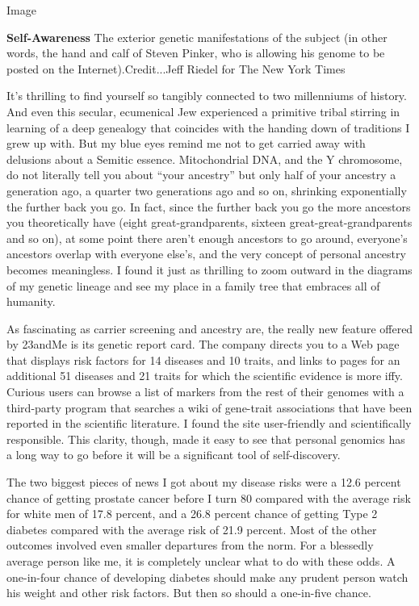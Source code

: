 Image

\textbf{Self-Awareness} The exterior genetic manifestations of the
subject (in other words, the hand and calf of Steven Pinker, who is
allowing his genome to be posted on the Internet).Credit...Jeff Riedel
for The New York Times

It's thrilling to find yourself so tangibly connected to two millenniums
of history. And even this secular, ecumenical Jew experienced a
primitive tribal stirring in learning of a deep genealogy that coincides
with the handing down of traditions I grew up with. But my blue eyes
remind me not to get carried away with delusions about a Semitic
essence. Mitochondrial DNA, and the Y chromosome, do not literally tell
you about ``your ancestry'' but only half of your ancestry a generation
ago, a quarter two generations ago and so on, shrinking exponentially
the further back you go. In fact, since the further back you go the more
ancestors you theoretically have (eight great-grandparents, sixteen
great-great-grandparents and so on), at some point there aren't enough
ancestors to go around, everyone's ancestors overlap with everyone
else's, and the very concept of personal ancestry becomes meaningless. I
found it just as thrilling to zoom outward in the diagrams of my genetic
lineage and see my place in a family tree that embraces all of humanity.

As fascinating as carrier screening and ancestry are, the really new
feature offered by 23andMe is its genetic report card. The company
directs you to a Web page that displays risk factors for 14 diseases and
10 traits, and links to pages for an additional 51 diseases and 21
traits for which the scientific evidence is more iffy. Curious users can
browse a list of markers from the rest of their genomes with a
third-party program that searches a wiki of gene-trait associations that
have been reported in the scientific literature. I found the site
user-friendly and scientifically responsible. This clarity, though, made
it easy to see that personal genomics has a long way to go before it
will be a significant tool of self-discovery.

The two biggest pieces of news I got about my disease risks were a 12.6
percent chance of getting prostate cancer before I turn 80 compared with
the average risk for white men of 17.8 percent, and a 26.8 percent
chance of getting Type 2 diabetes compared with the average risk of 21.9
percent. Most of the other outcomes involved even smaller departures
from the norm. For a blessedly average person like me, it is completely
unclear what to do with these odds. A one-in-four chance of developing
diabetes should make any prudent person watch his weight and other risk
factors. But then so should a one-in-five chance.

